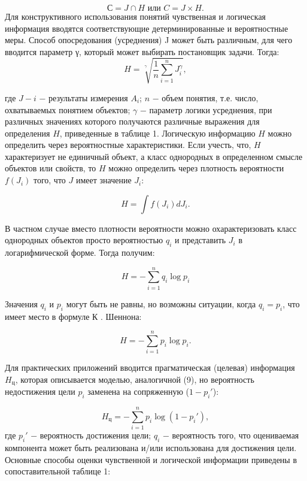 \documentclass[a4paper,12pt]{report}
\begin{document}
	\begin{equation}
\label{trivial}
 С = J \cap  H \mbox{ или } C = J \times H.		
\end{equation}						
	Для конструктивного использования понятий чувственная и логическая информация вводятся соответствующие детерминированные и вероятностные меры. Способ опосредования (усреднения) J может быть различным, для чего вводится параметр γ, который может выбирать постановщик задачи. Тогда:
	\begin{equation}
\label{trivial}
 H = \sqrt[ \gamma ]{ \frac{1}{n} \sum_{i = 1}^n J_i^\gamma}  , 
\end{equation}										 

где $J-i$ − результаты измерения $A_i$; $n$ − объем понятия, т.е. число, охватываемых понятием объектов; $\gamma$ − параметр логики усреднения, при различных значениях которого получаются различные выражения для определения $H$, приведенные в таблице 1.
	Логическую информацию $H$ можно определить через вероятностные характеристики. Если учесть, что, $H$ характеризует не единичный объект, а класс однородных в определенном смысле объектов или свойств, то $H$ можно определить через плотность вероятности $f(J_i)$ того, что $J$ имеет значение $J_i$:

	\begin{equation}
\label{trivial}
H = \int f( J_i)dJ_i  .
\end{equation} 										

	В частном случае вместо плотности вероятности можно охарактеризовать класс однородных объектов просто вероятностью $q_i$ и представить $J_i$ в логарифмической форме. Тогда получим:

	\begin{equation}
\label{trivial}
H =  -\sum_{i = 1}^{n}q_i \log p_i
\end{equation} 

Значения $q_i$ и $p_i$ могут быть не равны, но возможны ситуации, когда $q_i = p_i$, что имеет место в формуле К . Шеннона:

	\begin{equation}
\label{trivial}
H =  -\sum_{i = 1}^{n}p_i \log p_i.
\end{equation} 									      

	Для практических приложений вводится прагматическая (целевая) информация $H_ц$, которая описывается моделью, аналогичной (9), но вероятность недостижения цели $p_i$ заменена на сопряженную ($1 - p_i'$):

	\begin{equation}
\label{trivial}
H_ц = - \sum_{i=1}^{ n} p_i \log (1 - p_i'),
\end{equation} 
где $p_i'$ − вероятность достижения цели; $q_i$ − вероятность того, что оцениваемая компонента может быть реализована и/или использована для достижения цели.\\
Основные способы оценки чувственной и логической информации приведены в сопоставительной таблице 1:\\
\end{document}
